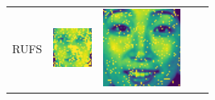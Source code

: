 \begin{table}[!ht]
\begin{tabular}{>{\centering\arraybackslash}p{0.95in}>{\centering\arraybackslash}p{1.0in}>{\centering\arraybackslash}p{1.0in}>{\centering\arraybackslash}p{1.0in}>{\centering\arraybackslash}p{1.0in}}
        RUFS & \parbox[c]{1.0in}{
        \includegraphics[width=1\linewidth]{figures/CPUFS/visualization/feaRUFS_ORL.pdf}} & \parbox[c]{1.0in}{
        \includegraphics[width=1\linewidth]{figures/CPUFS/visualization/feaRUFS_JAFFE.pdf}} & \parbox[c]{1.0in}{
}
\end{tabular}
\end{table}
